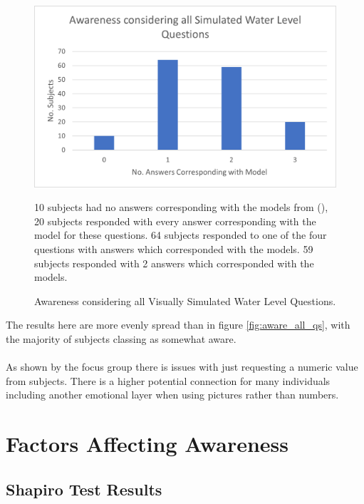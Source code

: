 \begin{figure}[H]
    \centering
    \includegraphics{fig_results/Awareness_ all_simulation_pictures_qs.png}
    \caption{Awareness considering all Visually Simulated Water Level Questions.}{ 10 subjects had no answers corresponding with the models from (\cite{kartverket_se_2020}), 20 subjects responded with every answer corresponding with the model for these questions. 64 subjects responded to one of the four questions with answers which corresponded with the models. 59 subjects responded with 2 answers which corresponded with the models. }
    \label{fig:aware_all_edited_photo}
\end{figure}


The results here are more evenly spread than in figure \ref{fig:aware_all_qs}, with the majority of subjects classing as somewhat aware.
\paragraph{}
 


\paragraph{}
As shown by the focus group there is issues with just requesting a numeric value from subjects. There is a higher potential connection for many individuals including another emotional layer when using pictures rather than numbers. 

\section{Factors Affecting Awareness}
  

\subsection{Shapiro Test Results}

